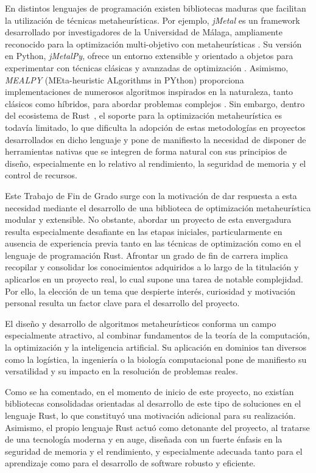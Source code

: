 \documentclass[12pt,a4paper,twoside,openright]{book}
\begin{document}
    En distintos lenguajes de programación existen bibliotecas maduras que facilitan la utilización de técnicas metaheurísticas. Por ejemplo, \textit{jMetal} es un framework desarrollado por investigadores de la Universidad de Málaga, ampliamente reconocido para la optimización multi-objetivo con metaheurísticas \cite{jmetal}. Su versión en Python, \textit{jMetalPy}, ofrece un entorno extensible y orientado a objetos para experimentar con técnicas clásicas y avanzadas de optimización \cite{jmetalpy}. Asimismo, \textit{MEALPY} (MEta-heuristic ALgorithms in PYthon) proporciona implementaciones de numerosos algoritmos inspirados en la naturaleza, tanto clásicos como híbridos, para abordar problemas complejos \cite{mealpy}. Sin embargo, dentro del ecosistema de Rust~\cite{rust_language}, el soporte para la optimización metaheurística es todavía limitado, lo que dificulta la adopción de estas metodologías en proyectos desarrollados en dicho lenguaje y pone de manifiesto la necesidad de disponer de herramientas nativas que se integren de forma natural con sus principios de diseño, especialmente en lo relativo al rendimiento, la seguridad de memoria y el control de recursos.

    
    Este Trabajo de Fin de Grado surge con la motivación de dar respuesta a esta necesidad mediante el desarrollo de una biblioteca de optimización metaheurística modular y extensible. No obstante, abordar un proyecto de esta envergadura resulta especialmente desafiante en las etapas iniciales, particularmente en ausencia de experiencia previa tanto en las técnicas de optimización como en el lenguaje de programación Rust. Afrontar un grado de fin de carrera implica recopilar y consolidar los conocimientos adquiridos a lo largo de la titulación y aplicarlos en un proyecto real, lo cual supone una tarea de notable complejidad. Por ello, la elección de un tema que despierte interés, curiosidad y motivación personal resulta un factor clave para el desarrollo del proyecto.
    
    El diseño y desarrollo de algoritmos metaheurísticos conforma un campo especialmente atractivo, al combinar fundamentos de la teoría de la computación, la optimización y la inteligencia artificial. Su aplicación en dominios tan diversos como la logística, la ingeniería o la biología computacional pone de manifiesto su versatilidad y su impacto en la resolución de problemas reales.
    
    Como se ha comentado, en el momento de inicio de este proyecto, no existían bibliotecas consolidadas orientadas al desarrollo de este tipo de soluciones en el lenguaje Rust, lo que constituyó una motivación adicional para su realización. Asimismo, el propio lenguaje Rust actuó como detonante del proyecto, al tratarse de una tecnología moderna y en auge, diseñada con un fuerte énfasis en la seguridad de memoria y el rendimiento, y especialmente adecuada tanto para el aprendizaje como para el desarrollo de software robusto y eficiente.
\end{document}
